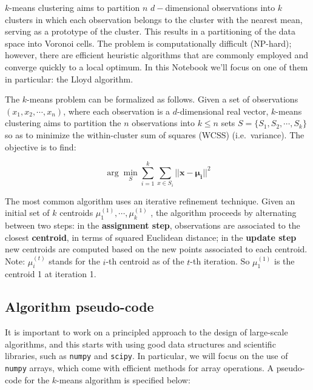\documentclass[11pt]{article}
\begin{document}
\(k\)-means clustering aims to partition \(n\) \(d-\)dimensional
observations into \(k\) clusters in which each observation belongs to
the cluster with the nearest mean, serving as a prototype of the
cluster. This results in a partitioning of the data space into Voronoi
cells. The problem is computationally difficult (NP-hard); however,
there are efficient heuristic algorithms that are commonly employed and
converge quickly to a local optimum. In this Notebook we'll focus on one
of them in particular: the Lloyd algorithm.

The \(k\)-means problem can be formalized as follows. Given a set of
observations \((x_1, x_2, \cdots, x_n)\), where each observation is a
\(d\)-dimensional real vector, \(k\)-means clustering aims to partition
the \(n\) observations into \(k \leq n\) sets
\(S = \{S_1, S_2, \cdots, S_k\}\) so as to minimize the within-cluster
sum of squares (WCSS) (i.e.~variance). The objective is to find:

\[
\arg \min_S \sum_{i=1}^{k} \sum_{x \in S_i} || \boldsymbol{x} - \boldsymbol{\mu_i} ||^2
\]

    The most common algorithm uses an iterative refinement technique. Given
an initial set of \(k\) centroids \(\mu_1^{(1)}, \cdots, \mu_k^{(1)}\) ,
the algorithm proceeds by alternating between two steps: in the
\textbf{assignment step}, observations are associated to the closest
\textbf{centroid}, in terms of squared Euclidean distance; in the
\textbf{update step} new centroids are computed based on the new points
associated to each centroid. Note: \(\mu_i^{(t)}\) stands for the
\(i\)-th centroid as of the \(t\)-th iteration. So \(\mu_1^{(1)}\) is
the centroid 1 at iteration 1.

    \hypertarget{algorithm-pseudo-code}{%
\subsection{Algorithm pseudo-code}\label{algorithm-pseudo-code}}

It is important to work on a principled approach to the design of
large-scale algorithms, and this starts with using good data structures
and scientific libraries, such as \texttt{numpy} and \texttt{scipy}. In
particular, we will focus on the use of \texttt{numpy} arrays, which
come with efficient methods for array operations. A pseudo-code for the
\(k\)-means algorithm is specified below:
\end{document}
